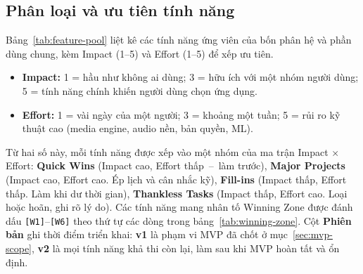 \subsection{Phân loại và ưu tiên tính năng}
\label{sec:feature-prioritization}

Bảng~\ref{tab:feature-pool} liệt kê các tính năng ứng viên của bốn phân hệ và phần dùng chung, kèm Impact (1--5) và Effort (1--5) để xếp ưu tiên.

\begin{itemize}
    \item \textbf{Impact:} 1 = hầu như không ai dùng;\allowbreak{} 3 = hữu ích với một nhóm người dùng;\allowbreak{} 5 = tính năng chính khiến người dùng chọn ứng dụng.
    \item \textbf{Effort:} 1 = vài ngày của một người;\allowbreak{} 3 = khoảng một tuần;\allowbreak{} 5 = rủi ro kỹ thuật cao (media engine, audio nền, bản quyền, ML).
\end{itemize}

Từ hai số này, mỗi tính năng được xếp vào một nhóm của ma trận Impact $\times$ Effort: \textbf{Quick Wins} (Impact cao, Effort thấp~--~làm trước), \textbf{Major Projects} (Impact cao, Effort cao. Ép lịch và cân nhắc kỹ), \textbf{Fill-ins} (Impact thấp, Effort thấp. Làm khi dư thời gian), \textbf{Thankless Tasks} (Impact thấp, Effort cao. Loại hoặc hoãn, ghi rõ lý do). Các tính năng mang nhân tố Winning Zone được đánh dấu \texttt{[W1]}--\texttt{[W6]} theo thứ tự các dòng trong bảng~\ref{tab:winning-zone}. Cột \textbf{Phiên bản} ghi thời điểm triển khai: \textbf{v1} là phạm vi MVP đã chốt ở mục~\ref{sec:mvp-scope}, \textbf{v2} là mọi tính năng khả thi còn lại, làm sau khi MVP hoàn tất và ổn định.

